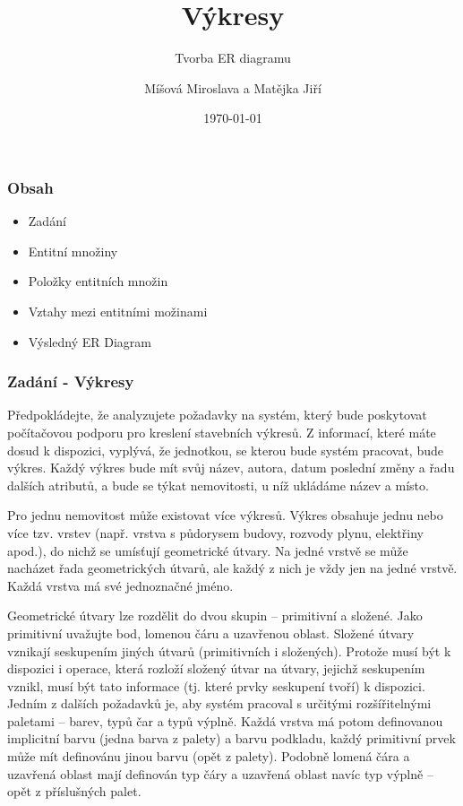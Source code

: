 \documentclass{beamer}
\title{Výkresy}
\subtitle{Tvorba ER diagramu}
\author{Míšová Miroslava a Matějka Jiří}
\date{\today}
\begin{document}
  \frame{\titlepage}
  \begin{frame}
    \frametitle{Obsah}

    \begin{itemize}
      \item Zadání
      \item Entitní množiny
      \item Položky entitních množin
      \item Vztahy mezi entitními možinami
      \item Výsledný ER Diagram
    \end{itemize}
  \end{frame}
  \begin{frame}
    \frametitle{Zadání - Výkresy}
    \hspace{2mm}
      \scriptsize{
      Předpokládejte, že analyzujete požadavky na systém, který bude poskytovat počítačovou
      podporu pro kreslení stavebních výkresů. Z informací, které máte dosud k dispozici,
      vyplývá, že jednotkou, se kterou bude systém pracovat, bude výkres. Každý výkres bude
      mít svůj název, autora, datum poslední změny a řadu dalších atributů, a bude se týkat
      nemovitosti, u níž ukládáme název a místo.\par


      \hspace{0.5cm}Pro jednu nemovitost může existovat více výkresů. Výkres obsahuje jednu nebo více tzv.
      vrstev (např. vrstva s půdorysem budovy, rozvody plynu, elektřiny apod.), do nichž se
      umísťují geometrické útvary. Na jedné vrstvě se může nacházet řada geometrických útvarů,
      ale každý z nich je vždy jen na jedné vrstvě. Každá vrstva má své jednoznačné jméno.\par


      \hspace{0.5cm}Geometrické útvary lze rozdělit do dvou skupin -- primitivní a složené. Jako primitivní
      uvažujte bod, lomenou čáru a uzavřenou oblast. Složené útvary vznikají seskupením jiných
      útvarů (primitivních i složených). Protože musí být k dispozici i operace, která rozloží
      složený útvar na útvary, jejichž seskupením vznikl, musí být tato informace (tj. které
      prvky seskupení tvoří) k dispozici. Jedním z dalších požadavků je, aby systém pracoval
      s určitými rozšířitelnými paletami -- barev, typů čar a typů výplně. Každá vrstva má
      potom definovanou implicitní barvu (jedna barva  z  palety) a barvu podkladu, každý
      primitivní prvek může mít definovánu jinou barvu (opět z palety). Podobně lomená čára
      a uzavřená oblast mají definován typ čáry a uzavřená oblast navíc typ výplně – opět
      z příslušných palet.\par}

  \end{frame}
\end{document}
